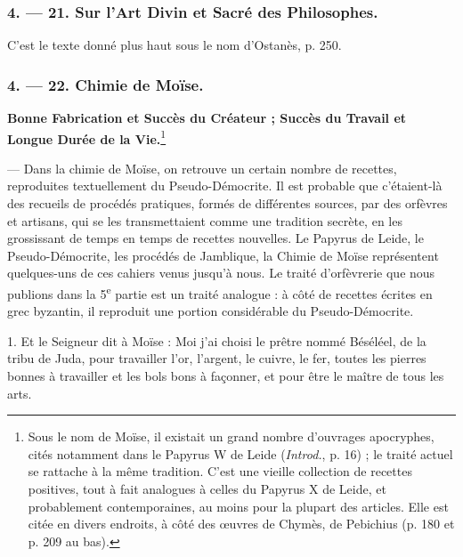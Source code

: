 \documentclass[a4paper, 11pt, oneside, polutonikogreek, french]{article}
\begin{document}
\bigskip
\centerline{\EightStarTaper}
\centerline{\EightStarTaper\EightStarTaper}
\bigskip

\subsubsection{4. --- 21. Sur l'Art Divin et Sacré des Philosophes.}

C'est le texte donné plus haut sous le nom d'Ostanès, p. 250.

\bigskip
\centerline{\EightStarTaper}
\centerline{\EightStarTaper\EightStarTaper}
\bigskip

\subsubsection{4. --- 22. Chimie de Moïse.}

\textbf{Bonne Fabrication et Succès du Créateur ; Succès du Travail et Longue Durée de la Vie.}\footnote{Sous le nom de Moïse, il existait un grand nombre d'ouvrages apocryphes, cités notamment dans le Papyrus W de Leide (\emph{Introd.}, p. 16) ; le traité actuel se rattache à la même tradition. C'est une vieille collection de recettes positives, tout à fait analogues à celles du Papyrus X de Leide, et probablement contemporaines, au moins pour la plupart des articles. Elle est citée en divers endroits, à côté des œuvres de Chymès, de Pebichius (p. 180 et p. 209 au bas).  }

--- Dans la chimie de Moïse, on retrouve un certain nombre de recettes, reproduites textuellement du Pseudo-Démocrite. Il est probable que c'étaient-là des recueils de procédés pratiques, formés de différentes sources, par des orfèvres et artisans, qui se les transmettaient comme une tradition secrète, en les grossissant de temps en temps de recettes nouvelles. Le Papyrus de Leide, le Pseudo-Démocrite, les procédés de Jamblique, la Chimie de Moïse représentent quelques-uns de ces cahiers venus jusqu'à nous. Le traité d'orfèvrerie que nous publions dans la 5\textsuperscript{e} partie est un traité analogue : à côté de recettes écrites en grec byzantin, il reproduit une portion considérable du Pseudo-Démocrite.

1. Et le Seigneur dit à Moïse : Moi j'ai choisi le prêtre nommé Béséléel, de la tribu de Juda, pour travailler l'or, l'argent, le cuivre, le fer, toutes les pierres bonnes à travailler et les bols bons à façonner, et pour être le maître de tous les arts.
\end{document}
